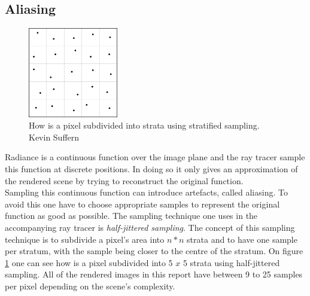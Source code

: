 \documentclass{article}
\begin{document}
\subsection{Aliasing}
\begin{figure}
    \centering
    \includegraphics[width=0.35\textwidth]{half_jittered}
    \caption{How is a pixel subdivided into strata using stratified sampling. \\Kevin Suffern}
    \label{fig:half_jittered}
\end{figure}

Radiance is a continuous function over the image plane and the ray tracer sample this function at discrete positions. In doing so it only gives an approximation of the rendered scene by trying to reconstruct the original function. \\
Sampling this continuous function can introduce artefacts, called aliasing. To avoid this one have to choose appropriate samples to represent the original function as good as possible. The sampling technique one uses in the accompanying ray tracer is \textit{half-jittered sampling}. The concept of this sampling technique is to subdivide a pixel's area into $n * n$ strata and to have one sample per stratum, with the sample being closer to the centre of the stratum. On figure \ref{fig:half_jittered} one can see how is a pixel subdivided into 5 $x$ 5 strata using half-jittered sampling. All of the rendered images in this report have between 9 to 25 samples per pixel depending on the scene's complexity. 

\newpage

\end{document}
